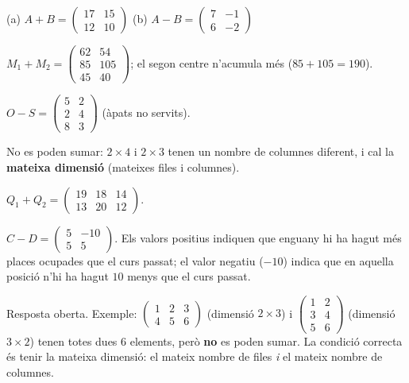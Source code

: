 \begin{solucions}
\begin{sollist}
  \item (a) $A+B=\begin{pmatrix} 17 & 15 \\ 12 & 10 \end{pmatrix}$ \quad
        (b) $A-B=\begin{pmatrix} 7 & -1 \\ 6 & -2 \end{pmatrix}$
  \item $M_1+M_2=\begin{pmatrix} 62 & 54 \\ 85 & 105 \\ 45 & 40 \end{pmatrix}$;
        \;el segon centre n'acumula més ($85+105=190$).
  \item $O-S=\begin{pmatrix} 5 & 2 \\ 2 & 4 \\ 8 & 3 \end{pmatrix}$
        (àpats no servits).
  \item No es poden sumar: $2\times 4$ i $2\times 3$ tenen un nombre de columnes
        diferent, i cal la \textbf{mateixa dimensió} (mateixes files i columnes).
  \item $Q_1+Q_2=\begin{pmatrix} 19 & 18 & 14 \\ 13 & 20 & 12 \end{pmatrix}$.
  \item $C-D=\begin{pmatrix} 5 & -10 \\ 5 & 5 \end{pmatrix}$. Els valors positius
        indiquen que enguany hi ha hagut més places ocupades que el curs passat; el
        valor negatiu ($-10$) indica que en aquella posició n'hi ha hagut $10$
        menys que el curs passat.
  \item Resposta oberta. Exemple: $\begin{pmatrix} 1 & 2 & 3 \\ 4 & 5 & 6 \end{pmatrix}$
        (dimensió $2\times 3$) i $\begin{pmatrix} 1 & 2 \\ 3 & 4 \\ 5 & 6 \end{pmatrix}$
        (dimensió $3\times 2$) tenen totes dues $6$ elements, però \textbf{no} es
        poden sumar. La condició correcta és tenir la mateixa dimensió: el mateix
        nombre de files \emph{i} el mateix nombre de columnes.
\end{sollist}
\end{solucions}

